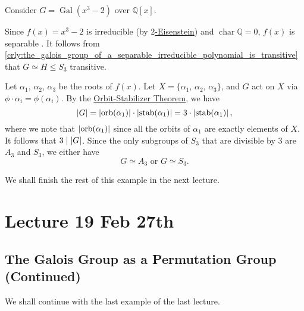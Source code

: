\documentclass[notoc,notitlepage,nobib]{tufte-book}
\DeclareMathOperator{\Gal}{Gal}
\DeclareMathOperator{\stab}{stab}
\DeclareMathOperator{\orb}{orb}
\DeclareMathOperator{\Char}{char}
\begin{document}
\begin{eg}
  Consider $G = \Gal(x^3 - 2)$ over $\mathbb{Q}[x]$.

  Since $f(x) = x^3 - 2$ is irreducible (by
  \hyperref[propo:eisenstein_s_criterion]{$2$-Eisenstein}) and $\Char \mathbb{Q} =
  0$, $f(x)$ is separable . It follows from
  \cref{crly:the_galois_group_of_a_separable_irreducible_polynomial_is_transitive}
  that $G \simeq H \leq S_3$ transitive.

  Let $\alpha_1, \, \alpha_2, \, \alpha_3$ be the roots of $f(x)$. Let $X = \{
  \alpha_1, \, \alpha_2, \, \alpha_3 \}$, and $G$ act on $X$ via $\phi \cdot
  \alpha_i = \phi(\alpha_i)$. By the
  \hyperref[thm:orbit_stabilizer_theorem]{Orbit-Stabilizer Theorem}, we have
  \begin{equation*}
    \abs{ G } = \abs{ \orb(\alpha_1) } \cdot \abs{ \stab(\alpha_1) } = 3 \cdot
    \abs{ \stab(\alpha_1) },
  \end{equation*}
  where we note that $\abs{ \orb(\alpha_1) }$ since all the orbits of $\alpha_1$
  are exactly elements of $X$. It follows that $3 \mid \left|G\right|$. Since the only
  subgroups of $S_3$ that are divisible by $3$ are $A_3$ and $S_3$, we either
  have
  \begin{equation*}
    G \simeq A_3 \text{ or } G \simeq S_3.
  \end{equation*}

\end{eg}

We shall finish the rest of this example in the next lecture.



\chapter{Lecture 19 Feb 27th}%
\label{chp:lecture_19_feb_27th}

\section{The Galois Group as a Permutation Group (Continued)}%
\label{sec:the_galois_group_as_a_permutation_group_continued}

We shall continue with the last example of the last lecture.
\end{document}

